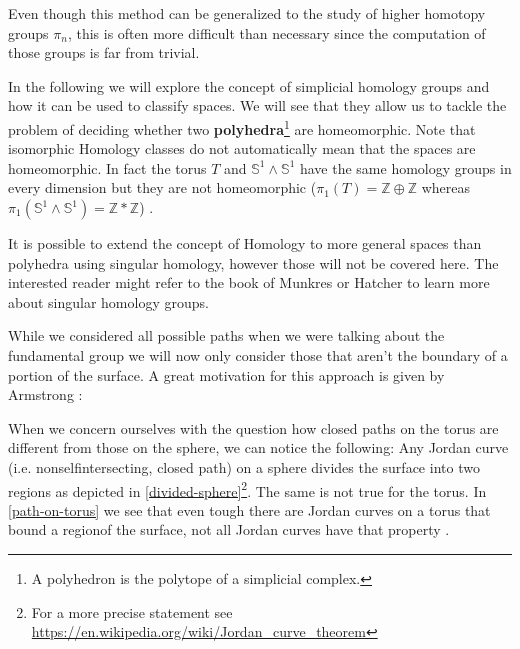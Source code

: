 \documentclass[toc=bib]{scrartcl}
\theoremstyle{plain}
\theoremstyle{definition}
\theoremstyle{remark}
\newcommand{\sh}{simplicial homology}
\newcommand{\Z}{\mathbb{Z}}
\begin{document}
Even though this method can be generalized to the study of higher homotopy groups $\pi_n$, this is often more difficult than necessary since the computation of those groups is far from trivial.

In the following we will explore the concept of \sh{} groups and how it can be used to classify spaces. We will see that they allow us to tackle the problem of deciding whether two \textbf{polyhedra}\footnote{A polyhedron is the polytope of a simplicial complex.} are homeomorphic. Note that isomorphic Homology classes do not automatically mean that the spaces are homeomorphic. In fact the torus $T$ and $\mathbb{S}^1\wedge\mathbb{S}^1$ have the same homology groups in every dimension but they are not homeomorphic ($\pi_1(T)=\Z\oplus\Z$ whereas $\pi_1(\mathbb{S}^1\wedge\mathbb{S}^1)=\Z\ast\Z$) .

It is possible to extend the concept of Homology to more general spaces than polyhedra using singular homology, however those will not be covered here. The interested reader might refer to the book of Munkres \cite{mu} or Hatcher \cite{ha} to learn more about singular homology groups.

While we considered all possible paths when we were talking about the fundamental group we will now only consider those that aren't the boundary of a portion of the surface. A great motivation for this approach is given by Armstrong \cite[p. 173f]{ar}:

When we concern ourselves with the question how closed paths on the torus are different from those on the sphere, we can notice the following:
Any Jordan curve (i.e. nonselfintersecting, closed path) on a sphere divides the surface into two \glqq regions\grqq{} as depicted in \autoref{divided-sphere}\footnote{For a more precise statement see \url{https://en.wikipedia.org/wiki/Jordan_curve_theorem}}. The same is not true for the torus. In \autoref{path-on-torus} we see that even tough there are Jordan curves on a torus that bound a \glqq region\grqq of the surface, not all Jordan curves have that property \cite[see][p. 173f]{ar}.



\end{document}
